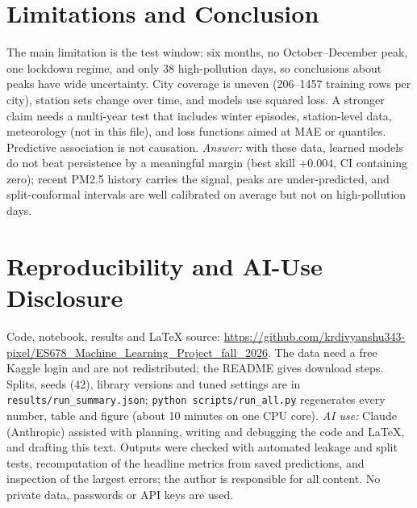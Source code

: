 \documentclass{article}
\begin{document}
\begin{table}[t]
\caption{Interval coverage (target 0.90) and mean width ($\mu$g/m$^3$); the last columns give coverage on high-pollution days of the whole window.}
\label{tab:int}
\centering\footnotesize\setlength{\tabcolsep}{3pt}

\end{table}

\section{Limitations and Conclusion}
The main limitation is the test window: six months, no October--December peak, one lockdown regime, and only 38 high-pollution days, so conclusions about peaks have wide uncertainty. City coverage is uneven (206--1457 training rows per city), station sets change over time, and models use squared loss. A stronger claim needs a multi-year test that includes winter episodes, station-level data, meteorology (not in this file), and loss functions aimed at MAE or quantiles. Predictive association is not causation. \emph{Answer:} with these data, learned models do not beat persistence by a meaningful margin (best skill $+0.004$, CI containing zero); recent PM2.5 history carries the signal, peaks are under-predicted, and split-conformal intervals are well calibrated on average but not on high-pollution days.

\section{Reproducibility and AI-Use Disclosure}
Code, notebook, results and LaTeX source: \url{https://github.com/krdivyanshu343-pixel/ES678_Machine_Learning_Project_fall_2026}. The data need a free Kaggle login and are not redistributed; the README gives download steps. Splits, seeds (42), library versions and tuned settings are in \texttt{results/run\_summary.json}; \texttt{python scripts/run\_all.py} regenerates every number, table and figure (about 10 minutes on one CPU core). \emph{AI use:} Claude (Anthropic) assisted with planning, writing and debugging the code and LaTeX, and drafting this text. Outputs were checked with automated leakage and split tests, recomputation of the headline metrics from saved predictions, and inspection of the largest errors; the author is responsible for all content. No private data, passwords or API keys are used.
\end{document}
